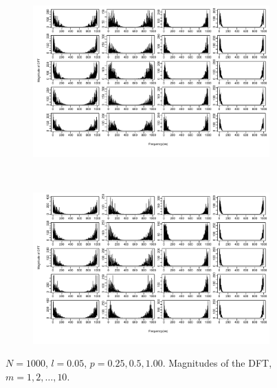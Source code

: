 \documentclass[11pt, a4paper]{article} %
\begin{document}
\begin{figure}
\begin{subfigure}{1.1\textwidth}
  \centering
  \includegraphics[width=\linewidth]{N1000_MagnDFT_l005_m_1_5.pdf}
  \label{fig:sfig1}
\end{subfigure}\\
\begin{subfigure}{1.1\textwidth}
  \centering
  \includegraphics[width=\linewidth]{N1000_MagnDFT_l005_m_6_10.pdf}
  \label{fig:sfig2}
\end{subfigure}
\label{fig1}
\caption{$N = 1000$, $l =0.05$, $p = 0.25, 0.5, 1.00$. Magnitudes of the DFT, $m = 1,2, \dots, 10$.}
\end{figure}

\restoregeometry


\end{document}
